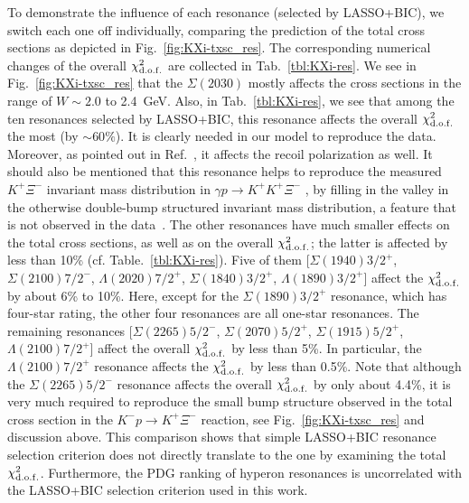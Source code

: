 \documentclass[10pt,aps,prc,superscriptaddress,twoside,twocolumn,nofootinbib,showpacs,preprintnumbers]{revtex4-1}
\begin{document}
To demonstrate the influence of each resonance (selected by LASSO+BIC), we switch each one off individually, comparing the prediction of the total cross sections as depicted in Fig.~\ref{fig:KXi-txsc_res}. The corresponding numerical changes of the overall $\chi^2_{\rm d.o.f.}$ are collected in Tab.~\ref{tbl:KXi-res}. We see in Fig.~\ref{fig:KXi-txsc_res} that the $\Sigma(2030)$ mostly affects the cross sections in the range of $W \sim 2.0$ to 2.4~GeV. Also, in Tab.~\ref{tbl:KXi-res}, we see that among the ten resonances selected by LASSO+BIC, this resonance affects the overall $\chi^2_{\rm d.o.f.}$ the most (by $\sim 60\%$). It is clearly needed in our model to reproduce the data. Moreover, as pointed out in Ref.~\cite{Jackson:2015dva}, it affects the recoil polarization as well. It should also be mentioned that this resonance helps to reproduce the measured $K^+\Xi^-$ invariant mass distribution in $\gamma p \to K^+ K^+ \Xi^-$ \cite{Man:2011np}, by filling in the valley in the otherwise double-bump structured invariant mass distribution, a feature that is not observed in the data~\cite{Guo:2007dw}. The other resonances have much smaller effects on the total cross sections, as well as on the overall $\chi^2_{\rm d.o.f.}$; the latter  is affected by less than 10\% (cf. Table.~\ref{tbl:KXi-res}).  Five of them  [$\Sigma(1940)3/2^+$, $\Sigma(2100)7/2^-$, $\Lambda(2020)7/2^+$, $\Sigma(1840)3/2^+$, $\Lambda(1890)3/2^+$] affect the $\chi^2_{\rm d.o.f.}$ by about 6\% to 10\%. Here, except for the $\Sigma(1890)3/2^+$ resonance, which has four-star rating, the other four resonances are all one-star resonances. The remaining resonances [$\Sigma(2265)5/2^-$, $\Sigma(2070)5/2^+$, $\Sigma(1915)5/2^+$, $\Lambda(2100)7/2^+$] affect the overall $\chi^2_{\rm d.o.f.}$ by less than 5\%.  In particular, the $\Lambda(2100)7/2^+$ resonance affects the $\chi^2_{\rm d.o.f.}$ by less than 0.5\%. Note that although the $\Sigma(2265)5/2^-$ resonance affects the overall $\chi^2_{\rm d.o.f.}$ by only about 4.4\%, it is very much required to reproduce the small bump structure observed in the total cross section in the $K^- p \to K^+ \Xi^-$ reaction, see Fig.~\ref{fig:KXi-txsc_res} and discussion above. This comparison shows that simple LASSO+BIC resonance selection criterion does not directly translate to the one by examining the total $\chi^2_{\rm d.o.f.}$. Furthermore, the PDG ranking of hyperon resonances is uncorrelated with the LASSO+BIC selection criterion used in this work.
\end{document}
